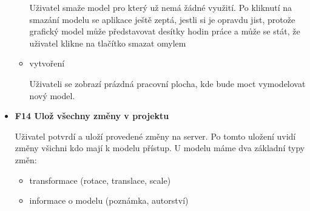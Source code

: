 \documentclass[thesis=B,czech]{FITthesis}[2012/06/26]
\begin{document}
\begin{itemize}
\begin{itemize}
                    Uživatel smaže model pro který už nemá žádné využití. Po kliknutí na smazání modelu se aplikace ještě zeptá, jestli si je opravdu jist, protože grafický model může představovat desítky hodin práce a může se stát, že uživatel klikne na tlačítko smazat omylem
                    \item vytvoření
                    
                    Uživateli se zobrazí prázdná pracovní plocha, kde bude moct vymodelovat nový model.
                \end{itemize}
                \item \textbf{F14 Ulož všechny změny v projektu}
                
                Uživatel potvrdí a uloží provedené změny na server. Po tomto uložení uvidí změny všichni kdo mají k modelu přístup.
                U modelu máme dva základní typy změn:
                \begin{itemize}
                    \item transformace (rotace, translace, scale)
                    \item informace o modelu (poznámka, autorství)
                \end{itemize}
            \end{itemize}
\end{document}
